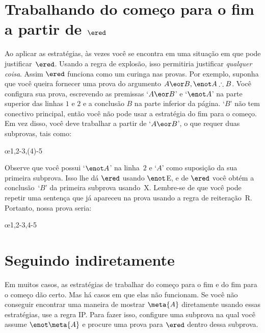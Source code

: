 
\section{Trabalhando do começo para o fim a partir de $\ered$}\label{sec:backred}

Ao aplicar as estratégias, às vezes você se encontra em uma situação em que pode justificar~$\ered$. Usando a regra de explosão, isso permitiria justificar \emph{qualquer coisa}. Assim $\ered$ funciona como um curinga nas provas. Por exemplo, suponha que você queira fornecer uma prova do argumento $A \eor B, \enot A \therefore B$. Você configura sua prova, escrevendo as premissas `$A \eor B$' e `$\enot A$' na parte superior das linhas $1$ e $2$ e a conclusão $B$ na parte inferior da página. `$B$' não tem conectivo principal, então você não pode usar a estratégia do fim para o começo. Em vez disso, você deve trabalhar a partir de `$A \eor B$', o que requer duas subprovas, tais como:


\begin{fitchproof}
	\open
	\ellipsesline 
	\close 
	\open
	\ellipsesline
	\close
	\oe{1,2-3,(4)-5} 
\end{fitchproof} 
Observe que você possui   `$\enot A$' na linha~$2$ e `$A$' como suposição da sua primeira subprova. Isso lhe dá  $\ered$  usando $\enot$E, e de $\ered$ você obtém a conclusão~`$B$' da primeira subprova usando~X. Lembre-se de que você pode repetir uma sentença que já apareceu na prova  usando a regra de reiteração~R. Portanto, nossa prova seria:
\begin{fitchproof}
	\open
	\close 
	\open
	\close
	\oe{1,2-3,4-5} 
\end{fitchproof} 
\section{Seguindo indiretamente}

Em muitos casos, as estratégias de trabalhar do começo para o fim  e do fim para o começo dão certo. Mas há casos em que elas não funcionam. Se você não conseguir encontrar uma maneira de mostrar $\meta{A}$ diretamente usando essas estratégias,  use a regra IP. Para fazer isso, configure uma subprova na qual você assume  $\enot\meta{A}$  e procure uma prova para $\ered$ dentro dessa subprova.

